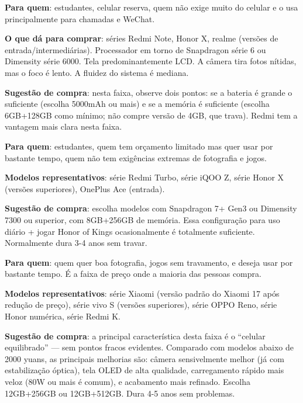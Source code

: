 
\textbf{Para quem}: estudantes, celular reserva, quem não exige muito do celular e o usa principalmente para chamadas e WeChat.

\textbf{O que dá para comprar}: séries Redmi Note, Honor X, realme (versões de entrada/intermediárias). Processador em torno de Snapdragon série 6 ou Dimensity série 6000. Tela predominantemente LCD. A câmera tira fotos nítidas, mas o foco é lento. A fluidez do sistema é mediana.

\textbf{Sugestão de compra}: nesta faixa, observe dois pontos: se a bateria é grande o suficiente (escolha 5000mAh ou mais) e se a memória é suficiente (escolha 6GB+128GB como mínimo; não compre versão de 4GB, que trava). Redmi tem a vantagem mais clara nesta faixa.


\textbf{Para quem}: estudantes, quem tem orçamento limitado mas quer usar por bastante tempo, quem não tem exigências extremas de fotografia e jogos.

\textbf{Modelos representativos}: série Redmi Turbo, série iQOO Z, série Honor X (versões superiores), OnePlus Ace (entrada).

\textbf{Sugestão de compra}: escolha modelos com Snapdragon 7+ Gen3 ou Dimensity 7300 ou superior, com 8GB+256GB de memória. Essa configuração para uso diário + jogar Honor of Kings ocasionalmente é totalmente suficiente. Normalmente dura 3-4 anos sem travar.


\textbf{Para quem}: quem quer boa fotografia, jogos sem travamento, e deseja usar por bastante tempo. É a faixa de preço onde a maioria das pessoas compra.

\textbf{Modelos representativos}: série Xiaomi (versão padrão do Xiaomi 17 após redução de preço), série vivo S (versões superiores), série OPPO Reno, série Honor numérica, série Redmi K.

\textbf{Sugestão de compra}: a principal característica desta faixa é o “celular equilibrado” — sem pontos fracos evidentes. Comparado com modelos abaixo de 2000 yuans, as principais melhorias são: câmera sensivelmente melhor (já com estabilização óptica), tela OLED de alta qualidade, carregamento rápido mais veloz (80W ou mais é comum), e acabamento mais refinado. Escolha 12GB+256GB ou 12GB+512GB. Dura 4-5 anos sem problemas.

